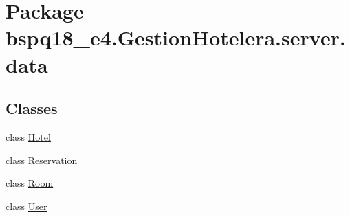 \hypertarget{namespacebspq18__e4_1_1_gestion_hotelera_1_1server_1_1data}{}\section{Package bspq18\+\_\+e4.\+Gestion\+Hotelera.\+server.\+data}
\label{namespacebspq18__e4_1_1_gestion_hotelera_1_1server_1_1data}
\subsection*{Classes}
\begin{DoxyCompactItemize}
\item 
class \mbox{\hyperlink{classbspq18__e4_1_1_gestion_hotelera_1_1server_1_1data_1_1_hotel}{Hotel}}
\item 
class \mbox{\hyperlink{classbspq18__e4_1_1_gestion_hotelera_1_1server_1_1data_1_1_reservation}{Reservation}}
\item 
class \mbox{\hyperlink{classbspq18__e4_1_1_gestion_hotelera_1_1server_1_1data_1_1_room}{Room}}
\item 
class \mbox{\hyperlink{classbspq18__e4_1_1_gestion_hotelera_1_1server_1_1data_1_1_user}{User}}
\end{DoxyCompactItemize}
